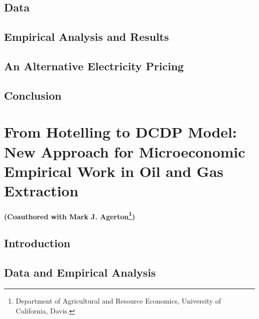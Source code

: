 \documentclass[11pt, final]{ucdavisthesis}
\begin{document}
\section{Data}
\label{C2-Section:Data}



\section{Empirical Analysis and Results}
\label{C2-Section:Empirical-Analysis-and-Results}



\section{An Alternative Electricity Pricing}
\label{C2-Section:An-Alternative-Electricity-Pricing}



\section{Conclusion}
\label{C2-Section:Conclusion}



\chapter{From Hotelling to DCDP Model: New Approach for Microeconomic Empirical Work in Oil and Gas Extraction}
\label{Chpater:Chapter-2}
\textbf{{\large
    (Coauthored with Mark J. Agerton\footnote{Department of Agricultural and Resource Economics, University of California, Davis.})
}} \vspace{0.7cm}

\section{Introduction}
\label{C3-Section:Introduction}



\section{Data and Empirical Analysis}
\label{C3-Section:Data-and-Empirical-Analysis}

\end{document}
